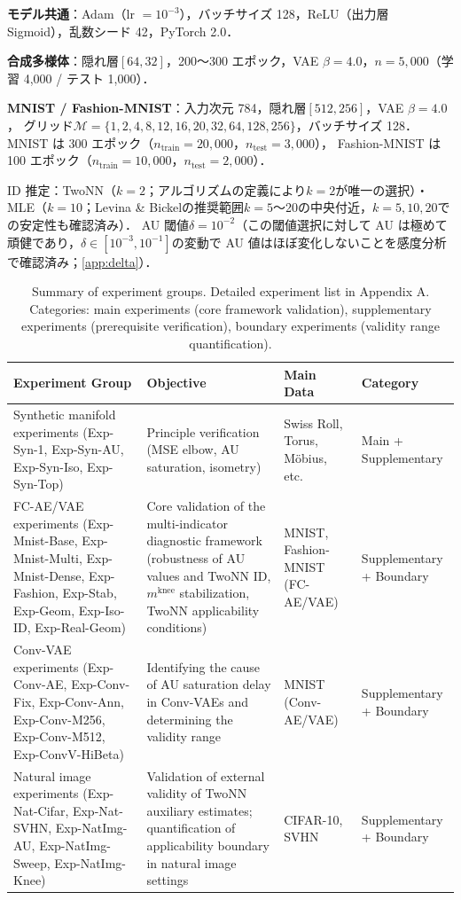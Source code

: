 \documentclass[11pt,a4paper]{jsarticle}
\newcommand{\mknee}{m^{\mathrm{knee}}}
\begin{document}
\textbf{モデル共通}：Adam（lr $= 10^{-3}$），バッチサイズ 128，ReLU（出力層 Sigmoid），乱数シード 42，PyTorch 2.0．

\textbf{合成多様体}：隠れ層$[64, 32]$，200〜300 エポック，VAE $\beta = 4.0$，$n = 5{,}000$（学習 4,000 / テスト 1,000）．

\textbf{MNIST / Fashion-MNIST}：入力次元 784，隠れ層$[512, 256]$，VAE $\beta = 4.0$，
グリッド$\mathcal{M} = \{1,2,4,8,12,16,20,32,64,128,256\}$，バッチサイズ 128．
MNIST は 300 エポック（$n_{\mathrm{train}} = 20{,}000$，$n_{\mathrm{test}} = 3{,}000$），
Fashion-MNIST は 100 エポック（$n_{\mathrm{train}} = 10{,}000$，$n_{\mathrm{test}} = 2{,}000$）．

ID 推定：TwoNN（$k=2$；アルゴリズムの定義により$k=2$が唯一の選択）・MLE（$k=10$；Levina \& Bickel\cite{levina2005mle}の推奨範囲$k=5$〜20の中央付近，$k=5,10,20$での安定性も確認済み）\cite{facco2017twonn,levina2005mle}．
AU 閾値$\delta = 10^{-2}$\cite{lucas2019elbo}（この閾値選択に対して AU は極めて頑健であり，$\delta \in [10^{-3}, 10^{-1}]$の変動で AU 値はほぼ変化しないことを感度分析で確認済み；\ref{app:delta}）．

\begin{table}[H]
\centering
\caption{Summary of experiment groups. Detailed experiment list in Appendix A. Categories: main experiments (core framework validation), supplementary experiments (prerequisite verification), boundary experiments (validity range quantification).}
\label{tab:exp_list}
\small
\begin{tabular}{p{4.5cm}p{4.0cm}p{3.0cm}p{2.5cm}}
\toprule
Experiment Group & Objective & Main Data & Category \\
\midrule
Synthetic manifold experiments
(Exp-Syn-1, Exp-Syn-AU, Exp-Syn-Iso, Exp-Syn-Top)
  & Principle verification (MSE elbow, AU saturation, isometry)
  & Swiss Roll, Torus, Möbius, etc.
  & Main + Supplementary \\
\addlinespace
FC-AE/VAE experiments
(Exp-Mnist-Base, Exp-Mnist-Multi, Exp-Mnist-Dense, Exp-Fashion, Exp-Stab, Exp-Geom, Exp-Iso-ID, Exp-Real-Geom)
  & Core validation of the multi-indicator diagnostic framework (robustness of AU values and TwoNN ID, $\mknee$ stabilization, TwoNN applicability conditions)
  & MNIST, Fashion-MNIST (FC-AE/VAE)
  & Supplementary + Boundary \\
\addlinespace
Conv-VAE experiments
(Exp-Conv-AE, Exp-Conv-Fix, Exp-Conv-Ann, Exp-Conv-M256, Exp-Conv-M512, Exp-ConvV-HiBeta)
  & Identifying the cause of AU saturation delay in Conv-VAEs and determining the validity range
  & MNIST (Conv-AE/VAE)
  & Supplementary + Boundary \\
\addlinespace
Natural image experiments
(Exp-Nat-Cifar, Exp-Nat-SVHN, Exp-NatImg-AU, Exp-NatImg-Sweep, Exp-NatImg-Knee)
  & Validation of external validity of TwoNN auxiliary estimates; quantification of applicability boundary in natural image settings
  & CIFAR-10, SVHN
  & Supplementary + Boundary \\
\bottomrule
\end{tabular}
\end{table}
\end{document}
